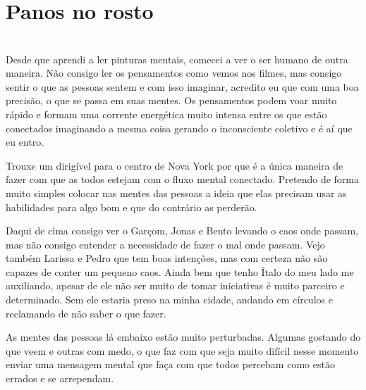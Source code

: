 
    


\newpage


\ifdefined\useChapters
\chapter{Panos no rosto}

\else
\chapter{}
\fi

Desde que aprendi a ler pinturas mentais, comecei a ver o ser humano de outra maneira. Não consigo ler os pensamentos como vemos nos filmes, mas consigo sentir o que as pessoas sentem e com isso imaginar, acredito eu que com uma boa precisão, o que se passa em suas mentes. Os pensamentos podem voar muito rápido e formam uma corrente energética muito intensa entre os que estão conectados imaginando a mesma coisa gerando o inconsciente coletivo e é aí que eu entro.

Trouxe um dirigível para o centro de Nova York por que é a única maneira de fazer com que as todos estejam com o fluxo mental conectado. Pretendo de forma muito simples colocar nas mentes das pessoas a ideia que elas precisam usar as habilidades para algo bom e que do contrário as perderão.

Daqui de cima consigo ver o Garçom, Jonas e Bento levando o caos onde passam, mas não consigo entender a necessidade de fazer o mal onde passam. Vejo também Larissa e Pedro que tem boas intenções, mas com certeza não são capazes de conter um pequeno caos. Ainda bem que tenho Ítalo do meu lado me auxiliando, apesar de ele não ser muito de tomar iniciativas é muito parceiro e determinado. Sem ele estaria preso na minha cidade, andando em círculos e reclamando de não saber o que fazer.

As mentes das pessoas lá embaixo estão muito perturbadas. Algumas gostando do que veem e outras com medo, o que faz com que seja muito difícil nesse momento enviar uma mensagem mental que faça com que todos percebam como estão errados e se arrependam.

